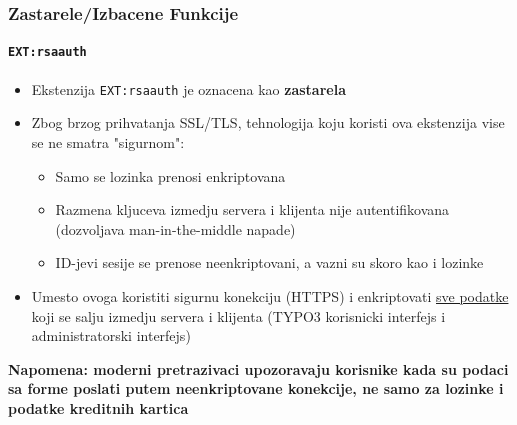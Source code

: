 \begin{frame}[fragile]
	\frametitle{Zastarele/Izbacene Funkcije}
	\framesubtitle{\texttt{EXT:rsaauth}}

	\begin{itemize}
		\item Ekstenzija \texttt{EXT:rsaauth} je oznacena kao \textbf{zastarela}
		\item Zbog brzog prihvatanja SSL/TLS, tehnologija koju koristi ova ekstenzija 
			vise se ne smatra "sigurnom":

			\begin{itemize}
				\item Samo se lozinka prenosi enkriptovana
				\item Razmena kljuceva izmedju servera i klijenta nije autentifikovana\newline
					(dozvoljava man-in-the-middle napade)
				\item ID-jevi sesije se prenose neenkriptovani, a vazni su skoro kao i lozinke
			\end{itemize}

		\item Umesto ovoga koristiti sigurnu konekciju (HTTPS) i enkriptovati \underline{sve podatke}
			koji se salju izmedju servera i klijenta (TYPO3 korisnicki interfejs i administratorski interfejs)

	\end{itemize}

	\smaller
		\textbf{Napomena: moderni pretrazivaci upozoravaju korisnike kada su podaci sa forme poslati 
			putem neenkriptovane konekcije, ne samo za lozinke i podatke kreditnih kartica}
	\normalsize

\end{frame}

